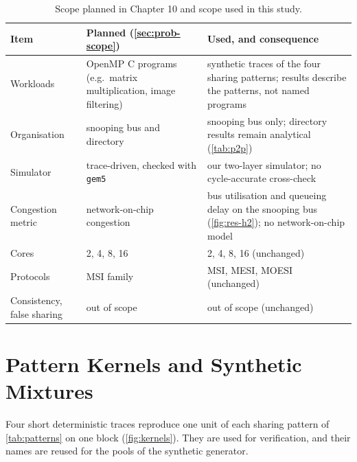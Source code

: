 \begin{table}[htbp]
\centering
\caption{Scope planned in Chapter 10 and scope used in this study.}
\label{tab:scope-change}
\small
\begin{tabular}{@{}L{2.6cm} L{4.2cm} L{5.8cm}@{}}
\toprule
Item & Planned (\cref{sec:prob-scope}) & Used, and consequence \\
\midrule
Workloads & OpenMP C programs (e.g.\ matrix multiplication, image filtering) &
  synthetic traces of the four sharing patterns; results describe the patterns,
  not named programs \\
Organisation & snooping bus and directory & snooping bus only; directory
  results remain analytical (\cref{tab:p2p}) \\
Simulator & trace-driven, checked with \texttt{gem5} & our two-layer simulator;
  no cycle-accurate cross-check \\
Congestion metric & network-on-chip congestion & bus utilisation and queueing
  delay on the snooping bus (\cref{fig:res-h2}); no network-on-chip model \\
Cores & 2, 4, 8, 16 & 2, 4, 8, 16 (unchanged) \\
Protocols & MSI family & MSI, MESI, MOESI (unchanged) \\
Consistency, false sharing & out of scope & out of scope (unchanged) \\
\bottomrule
\end{tabular}
\end{table}

\section{Pattern Kernels and Synthetic Mixtures}
\label{sec:wl-kernels}
\label{sec:wl-mixtures}
%

Four short deterministic traces reproduce one unit of each sharing pattern of
\cref{tab:patterns} on one block (\cref{fig:kernels}). They are used for
verification, and their names are reused for the pools of the synthetic generator.

